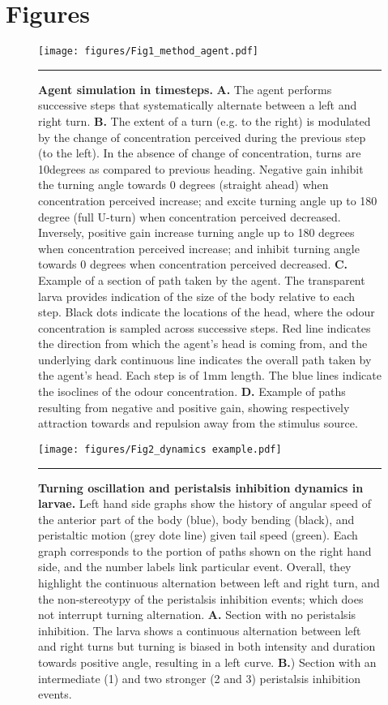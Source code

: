 \documentclass[10pt,a4paper]{article}
\begin{document}
\newpage
\section{Figures}
\begin{figure}[!ht]
\begin{center}
\texttt{[image: figures/Fig1\_method\_agent.pdf]}
\caption{
{\bf Agent simulation in timesteps.} {\bf A.} The agent performs successive steps that systematically alternate between a left and right turn. {\bf B.} The extent of a turn (e.g. to the right) is modulated by the change of concentration perceived during the previous step (to the left). In the absence of change of concentration, turns are 10degrees as compared to previous heading. Negative gain inhibit the turning angle towards 0 degrees (straight ahead) when concentration perceived increase; and excite turning angle up to 180 degree (full U-turn) when concentration perceived decreased. Inversely, positive gain increase turning angle up to 180 degrees when concentration perceived increase; and inhibit turning angle towards 0 degrees when concentration perceived decreased.
{\bf C.} Example of a section of path taken by the agent. The transparent larva provides indication of the size of the body relative to each step. Black dots indicate the locations of the head, where the odour concentration is sampled across successive steps. Red line indicates the direction from which the agent’s head is coming from, and the underlying dark continuous line indicates the overall path taken by the agent’s head. Each step is of 1mm length. The blue lines indicate the isoclines of the odour concentration.
{\bf D.} Example of paths resulting from negative and positive gain, showing respectively attraction towards and repulsion away from the stimulus source.
\label{fig:Fig1}}
\hrule
\end{center}
\end{figure}

\begin{figure}[!ht]
\begin{center}
\texttt{[image: figures/Fig2\_dynamics example.pdf]}
\caption{{\bf Turning oscillation and peristalsis inhibition dynamics in larvae.} 
Left hand side graphs show the history of angular speed of the anterior part of the body (blue), body bending (black), and peristaltic motion (grey dote line) given tail speed (green). Each graph corresponds to the portion of paths shown on the right hand side, and the number labels link particular event. Overall, they highlight the continuous alternation between left and right turn, and the non-stereotypy of the peristalsis inhibition events; which does not interrupt turning alternation.
{\bf A.} Section with no peristalsis inhibition. The larva shows a continuous alternation between left and right turns but turning is biased in both intensity and duration towards positive angle, resulting in a left curve.
{\bf B.}) Section with an intermediate (1) and two stronger (2 and 3) peristalsis inhibition events.
\label{fig:Fig2}
}
\hrule
\end{center}
\end{figure}
\end{document}
